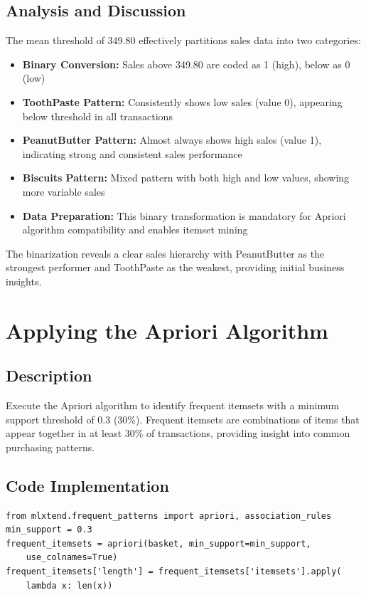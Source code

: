 \documentclass[12pt,a4paper]{article}
\begin{document}
\subsection{Analysis and Discussion}
The mean threshold of 349.80 effectively partitions sales data into two categories:

\begin{itemize}
    \item \textbf{Binary Conversion:} Sales above 349.80 are coded as 1 (high), below as 0 (low)
    \item \textbf{ToothPaste Pattern:} Consistently shows low sales (value 0), appearing below threshold in all transactions
    \item \textbf{PeanutButter Pattern:} Almost always shows high sales (value 1), indicating strong and consistent sales performance
    \item \textbf{Biscuits Pattern:} Mixed pattern with both high and low values, showing more variable sales
    \item \textbf{Data Preparation:} This binary transformation is mandatory for Apriori algorithm compatibility and enables itemset mining
\end{itemize}

The binarization reveals a clear sales hierarchy with PeanutButter as the strongest performer and ToothPaste as the weakest, providing initial business insights.



\section{Applying the Apriori Algorithm}

\subsection{Description}
Execute the Apriori algorithm to identify frequent itemsets with a minimum support threshold of 0.3 (30\%). Frequent itemsets are combinations of items that appear together in at least 30\% of transactions, providing insight into common purchasing patterns.

\subsection{Code Implementation}

\begin{lstlisting}
from mlxtend.frequent_patterns import apriori, association_rules
min_support = 0.3
frequent_itemsets = apriori(basket, min_support=min_support, 
    use_colnames=True)
frequent_itemsets['length'] = frequent_itemsets['itemsets'].apply(
    lambda x: len(x))
\end{lstlisting}
\end{document}
